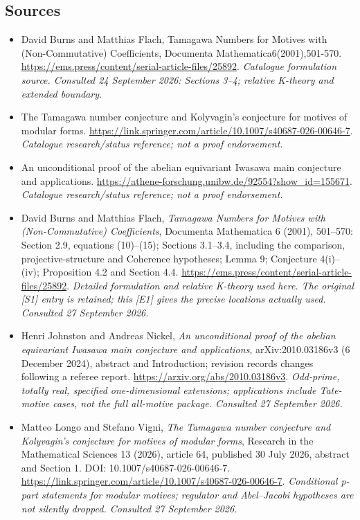 \documentclass[11pt,a4paper]{article}
\numberwithin{equation}{section}
\begin{document}
\subsection{Sources}
\begin{itemize}\raggedright
\item[\textnormal{[S1]}]\hypertarget{source:statement:1}{} David Burns and Matthias Flach, Tamagawa Numbers for Motives with (Non-Commutative) Coefficients, Documenta Mathematica6(2001),501-570.
\url{https://ems.press/content/serial-article-files/25892}.
{\small\textit{Catalogue formulation source. Consulted 24 September 2026: Sections 3--4; relative K-theory and extended boundary.}}
\item[\textnormal{[S2]}]\hypertarget{source:statement:2}{} The Tamagawa number conjecture and Kolyvagin's conjecture for motives of modular forms.
\url{https://link.springer.com/article/10.1007/s40687-026-00646-7}.
{\small\textit{Catalogue research/status reference; not a proof endorsement.}}
\item[\textnormal{[S3]}]\hypertarget{source:statement:3}{} An unconditional proof of the abelian equivariant Iwasawa main conjecture and applications.
\url{https://athene-forschung.unibw.de/92554?show_id=155671}.
{\small\textit{Catalogue research/status reference; not a proof endorsement.}}

\item[\textnormal{[E1]}]\hypertarget{extra:statement:1}{} David Burns and Matthias Flach, \emph{Tamagawa Numbers for Motives with (Non-Commutative) Coefficients}, Documenta Mathematica 6 (2001), 501--570: Section 2.9, equations (10)--(15); Sections 3.1--3.4, including the comparison, projective-structure and Coherence hypotheses; Lemma 9; Conjecture 4(i)--(iv); Proposition 4.2 and Section 4.4.
\url{https://ems.press/content/serial-article-files/25892}.
{\small\textit{Detailed formulation and relative K-theory used here. The original [S1] entry is retained; this [E1] gives the precise locations actually used. Consulted 27 September 2026.}}
\item[\textnormal{[E2]}]\hypertarget{extra:statement:2}{} Henri Johnston and Andreas Nickel, \emph{An unconditional proof of the abelian equivariant Iwasawa main conjecture and applications}, arXiv:2010.03186v3 (6 December 2024), abstract and Introduction; revision records changes following a referee report.
\url{https://arxiv.org/abs/2010.03186v3}.
{\small\textit{Odd-prime, totally real, specified one-dimensional extensions; applications include Tate-motive cases, not the full all-motive package. Consulted 27 September 2026.}}
\item[\textnormal{[E3]}]\hypertarget{extra:statement:3}{} Matteo Longo and Stefano Vigni, \emph{The Tamagawa number conjecture and Kolyvagin's conjecture for motives of modular forms}, Research in the Mathematical Sciences 13 (2026), article 64, published 30 July 2026, abstract and Section 1. DOI: 10.1007/s40687-026-00646-7.
\url{https://link.springer.com/article/10.1007/s40687-026-00646-7}.
{\small\textit{Conditional p-part statements for modular motives; regulator and Abel--Jacobi hypotheses are not silently dropped. Consulted 27 September 2026.}}
\end{itemize}
\end{document}
